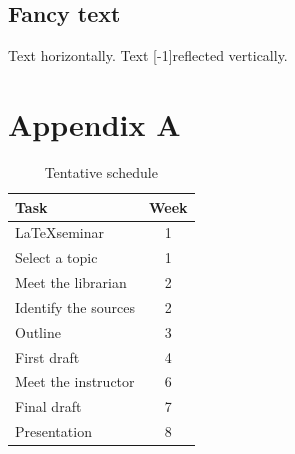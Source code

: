 \documentclass[11pt]{sigplanconf}
\begin{document}
\subsection{Fancy text}

Text  horizontally.
Text \scalebox{1}[-1]{reflected} vertically.




\section*{Appendix A}

\begin{table}[!htbp]
    \centering
    \begin{tabular}{|l|c|}
        \hline
        Task                 & Week \\
        \hline
        \LaTeX seminar       & 1    \\
        Select a topic       & 1    \\
        Meet the librarian   & 2    \\
        Identify the sources & 2    \\
        Outline              & 3    \\
        First draft          & 4    \\
        Meet the instructor  & 6    \\
        Final draft          & 7    \\
        Presentation         & 8    \\
        \hline
    \end{tabular}
    \caption{Tentative schedule}
    \label{tbl:schedule}
\end{table}
\end{document}
